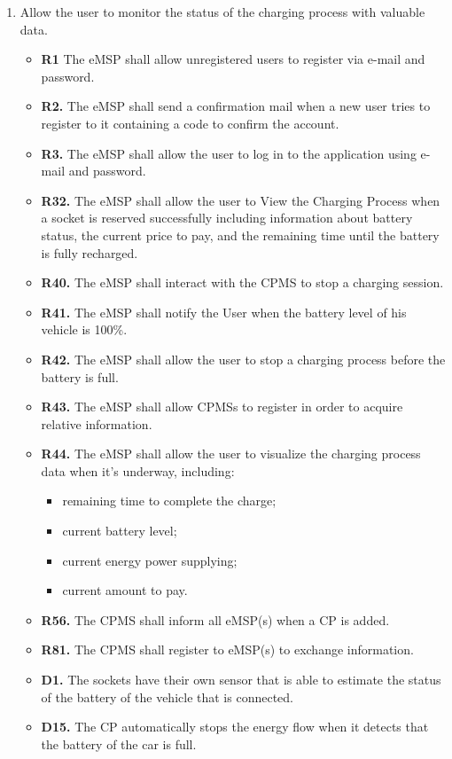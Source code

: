 \documentclass{Configuration_Files/PoliMi3i_thesis}
\begin{document}
\begin{enumerate}[label=\textbf{G\arabic*}]
    \item Allow the user to monitor the status of the charging process with valuable data.
        \begin{itemize}
            \item \textbf{R1} The eMSP shall allow unregistered users to register via e-mail and password.
            \item \textbf{R2.} The eMSP shall send a confirmation mail when a new user tries to register to it containing a code to confirm the account.
            \item \textbf{R3.} The eMSP shall allow the user to log in to the application using e-mail and password.
            \item \textbf{R32.} The eMSP shall allow the user to View  the Charging Process when a socket is reserved successfully including information about battery status, the current price to pay, and the remaining time until the battery is fully recharged.
            \item \textbf{R40.} The eMSP shall interact with the CPMS to stop a charging session.
            \item \textbf{R41.} The eMSP shall notify the User when the battery level of his vehicle is 100\%.
            \item \textbf{R42.} The eMSP shall allow the user to stop a charging process before the battery is full.
            \item \textbf{R43.} The eMSP shall allow CPMSs to register in order to acquire relative information.
            \item \textbf{R44.} The eMSP shall allow the user to visualize the charging process data when it’s underway, including:
                \begin{itemize}
                    \item remaining time to complete the charge;
                    \item current battery level;
                    \item current energy power supplying;
                    \item current amount to pay.
                \end{itemize}
            \item \textbf{R56.} The CPMS shall inform all eMSP(s) when a CP is added.
            \item \textbf{R81.} The CPMS shall register to eMSP(s) to exchange information.
            \item \textbf{D1.} The sockets have their own sensor that is able to estimate the status of the battery of the vehicle that is connected.
            \item \textbf{D15.} The CP automatically stops the energy flow when it detects that the battery of the car is full.
        \end{itemize}


\end{enumerate}
\end{document}
